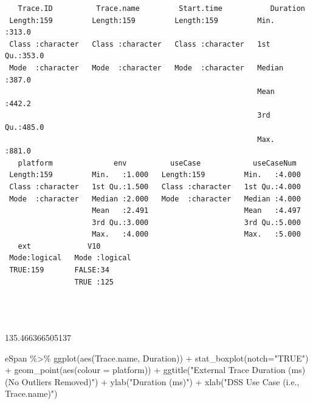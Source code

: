 \documentclass[
  letterpaper,
  DIV=11,
  numbers=noendperiod]{scrartcl}
\newenvironment{Shaded}{\begin{snugshade}}{\end{snugshade}}
\newcommand{\AttributeTok}[1]{\textcolor[rgb]{0.40,0.45,0.13}{#1}}
\newcommand{\FunctionTok}[1]{\textcolor[rgb]{0.28,0.35,0.67}{#1}}
\newcommand{\NormalTok}[1]{\textcolor[rgb]{0.00,0.23,0.31}{#1}}
\newcommand{\SpecialCharTok}[1]{\textcolor[rgb]{0.37,0.37,0.37}{#1}}
\newcommand{\StringTok}[1]{\textcolor[rgb]{0.13,0.47,0.30}{#1}}
\begin{document}
\begin{verbatim}
   Trace.ID          Trace.name         Start.time           Duration    
 Length:159         Length:159         Length:159         Min.   :313.0  
 Class :character   Class :character   Class :character   1st Qu.:353.0  
 Mode  :character   Mode  :character   Mode  :character   Median :387.0  
                                                          Mean   :442.2  
                                                          3rd Qu.:485.0  
                                                          Max.   :881.0  
   platform              env          useCase            useCaseNum   
 Length:159         Min.   :1.000   Length:159         Min.   :4.000  
 Class :character   1st Qu.:1.500   Class :character   1st Qu.:4.000  
 Mode  :character   Median :2.000   Mode  :character   Median :4.000  
                    Mean   :2.491                      Mean   :4.497  
                    3rd Qu.:3.000                      3rd Qu.:5.000  
                    Max.   :4.000                      Max.   :5.000  
   ext             V10         
 Mode:logical   Mode :logical  
 TRUE:159       FALSE:34       
                TRUE :125      
                               
                               
                               
\end{verbatim}

135.466366505137

\begin{Shaded}
\begin{Highlighting}[]
\NormalTok{eSpan }\SpecialCharTok{\%\textgreater{}\%}
    \FunctionTok{ggplot}\NormalTok{(}\FunctionTok{aes}\NormalTok{(Trace.name, Duration)) }\SpecialCharTok{+} 
    \FunctionTok{stat\_boxplot}\NormalTok{(}\AttributeTok{notch=}\StringTok{"TRUE"}\NormalTok{) }\SpecialCharTok{+} \FunctionTok{geom\_point}\NormalTok{(}\FunctionTok{aes}\NormalTok{(}\AttributeTok{colour =}\NormalTok{ platform)) }\SpecialCharTok{+}
    \FunctionTok{ggtitle}\NormalTok{(}\StringTok{"External Trace Duration (ms) (No Outliers Removed)"}\NormalTok{) }\SpecialCharTok{+}
    \FunctionTok{ylab}\NormalTok{(}\StringTok{"Duration (ms)"}\NormalTok{) }\SpecialCharTok{+}
    \FunctionTok{xlab}\NormalTok{(}\StringTok{"DSS Use Case (i.e., Trace.name)"}\NormalTok{)}
\end{Highlighting}
\end{Shaded}
\end{document}
